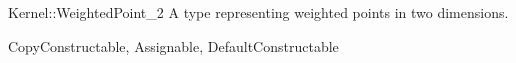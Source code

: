 \begin{ccRefConcept}{Kernel::WeightedPoint_2}
A type representing weighted points in two dimensions.

\ccRefines
CopyConstructable, Assignable, DefaultConstructable

\ccSeeAlso
{} \\
 \\
 \\
 \\

\end{ccRefConcept}
